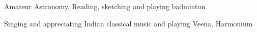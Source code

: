 
\begin{cventries}
\fontsize{9pt}{1em}\bodyfontlight\color{text}
  \begin{cvitems}
    \item Amateur Astronomy, Reading, sketching and playing badminton
    \item Singing and appreciating Indian classical music and playing Veena, Harmonium
  \end{cvitems}
%   
\end{cventries}


